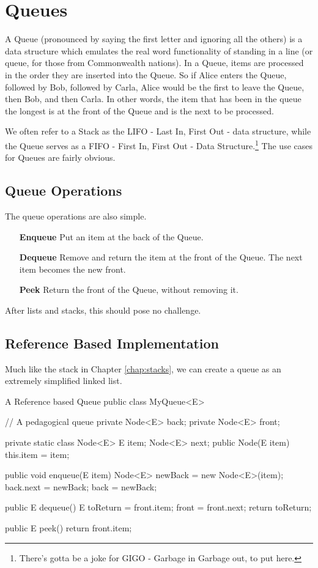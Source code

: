 
\chapter{Queues}
\label{chap-queue}

A Queue (pronounced by saying the first letter and ignoring all the others) is a data structure which emulates the real word functionality of standing in a line (or queue, for those from Commonwealth nations).  
In a Queue, items are processed in the order they are inserted into the Queue.  So if Alice enters the Queue, followed by Bob, followed by Carla, Alice would be the first to leave the Queue, then Bob, and then Carla.
In other words, the item that has been in the queue the longest is at the front of the Queue and is the next to be processed.


We often refer to a Stack as the LIFO - Last In, First Out - data structure, while the Queue serves as a FIFO - First In, First Out - Data Structure.\footnote{There's gotta be a joke for GIGO - Garbage in Garbage out, to put here.}
The use cases for Queues are fairly obvious.

\section{Queue Operations}
The queue operations are also simple. 

\begin{enumerate}
	\item[\textbf{Enqueue}] Put an item at the back of the Queue.
	\item[\textbf{Dequeue}] Remove and return the item at the front of the Queue.  The next item becomes the new front.
	\item[\textbf{Peek}] Return the front of the Queue, without removing it.
\end{enumerate}


After lists and stacks, this should pose no challenge.
\section{Reference Based Implementation}

Much like the stack in Chapter \ref{chap:stacks}, we can create a queue as an extremely simplified linked list.       

\begin{javacode}{A Reference based Queue}
public class MyQueue<E> {
	// A pedagogical queue
	private Node<E> back;
	private Node<E> front;
	
	private static class Node<E>{
		E item;
		Node<E> next;
		public Node(E item) {
			this.item = item;
		}
	}
	
	public void enqueue(E item){
		Node<E> newBack =  new Node<E>(item);
		back.next = newBack;
		back =  newBack;
	}
	
	public E dequeue() {
		E toReturn =  front.item;
		front = front.next;
		return toReturn;
	}
	
	public E peek() {
		return front.item;
	}
}

\end{javacode}



